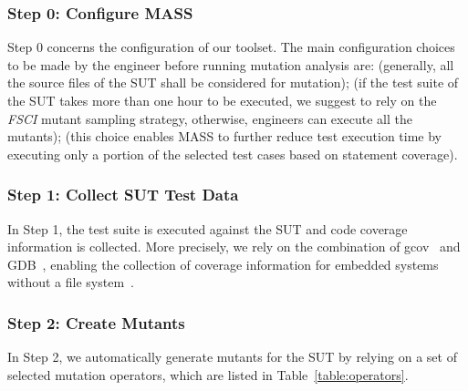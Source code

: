 \subsubsection{Step 0: Configure MASS}

Step 0 concerns the configuration of our toolset. 
The main configuration choices to be made by the engineer before running mutation analysis are:
 (generally, all the source files of the SUT shall be considered for mutation);
 (if the test suite of the SUT takes more than one hour to be executed, we suggest to rely on the \emph{FSCI} mutant sampling strategy, otherwise, engineers can execute all the mutants);
 (this choice enables MASS to further reduce test execution time by executing only a portion of the selected test cases based on statement coverage). 






\subsubsection{Step 1: Collect SUT Test Data}

In Step 1, the test suite is executed against the SUT
and code coverage information is collected.
More precisely, we rely on the combination of gcov~\cite{GCOV}
and GDB~\cite{GDB}, enabling the collection of coverage information for embedded systems without a file system~\cite{THANASSIS}.

\subsubsection{Step 2: Create Mutants}

In Step 2, we automatically generate mutants for the SUT by relying on a set of selected mutation operators, which are listed in Table~\ref{table:operators}.


%

%
%
